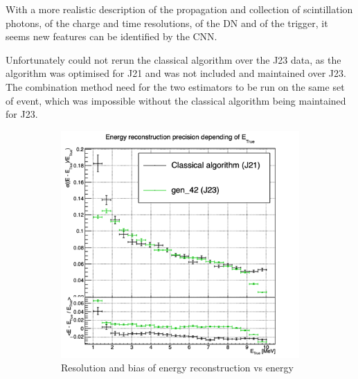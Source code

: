 \documentclass[../main.tex]{subfiles}
\begin{document}
{{With a more realistic description of the propagation and collection of scintillation photons, of the charge and time resolutions, of the DN and of the trigger, it seems new features can be identified by the CNN.

Unfortunately could not rerun the classical algorithm over the J23 data, as the algorithm was optimised for J21 and was not included and maintained over J23. The combination method need for the two estimators to be run on the same set of event, which was impossible without the classical algorithm being maintained for J23.

\begin{figure}[ht]
  \centering
  \begin{subfigure}[t]{0.32\linewidth}
    \centering
    \includegraphics[width=\linewidth]{images/jcnn/vic_cnn/multi_vic_42_MESBvETC.png}
    \caption{Resolution and bias of energy reconstruction vs energy}
    \label{fig:jcnn:vic_cnn:multi_vic_42_MESBvETC}
  \end{subfigure}
  \begin{subfigure}[t]{0.32\linewidth}
    \centering

\end{subfigure}
\end{figure}}}
\end{document}
